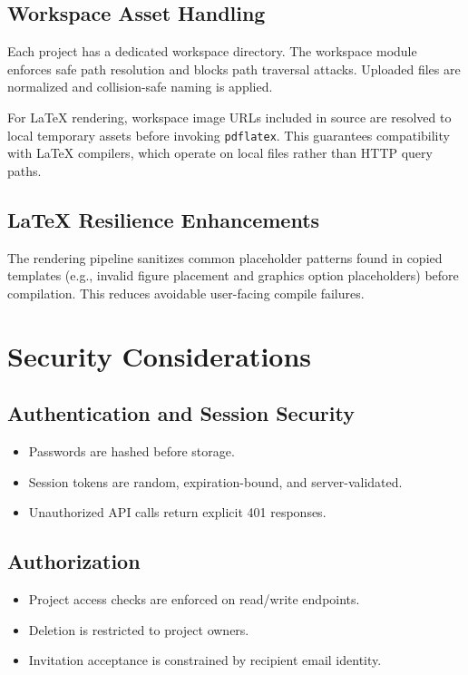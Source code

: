\documentclass[11pt,a4paper]{article}
\begin{document}
\subsection{Workspace Asset Handling}
Each project has a dedicated workspace directory. The workspace module enforces safe path resolution and blocks path traversal attacks. Uploaded files are normalized and collision-safe naming is applied.

For LaTeX rendering, workspace image URLs included in source are resolved to local temporary assets before invoking \texttt{pdflatex}. This guarantees compatibility with LaTeX compilers, which operate on local files rather than HTTP query paths.

\subsection{LaTeX Resilience Enhancements}
The rendering pipeline sanitizes common placeholder patterns found in copied templates (e.g., invalid figure placement and graphics option placeholders) before compilation. This reduces avoidable user-facing compile failures.

\section{Security Considerations}
\subsection{Authentication and Session Security}
\begin{itemize}[leftmargin=1.5em]
  \item Passwords are hashed before storage.
  \item Session tokens are random, expiration-bound, and server-validated.
  \item Unauthorized API calls return explicit 401 responses.
\end{itemize}

\subsection{Authorization}
\begin{itemize}[leftmargin=1.5em]
  \item Project access checks are enforced on read/write endpoints.
  \item Deletion is restricted to project owners.
  \item Invitation acceptance is constrained by recipient email identity.
\end{itemize}
\end{document}
